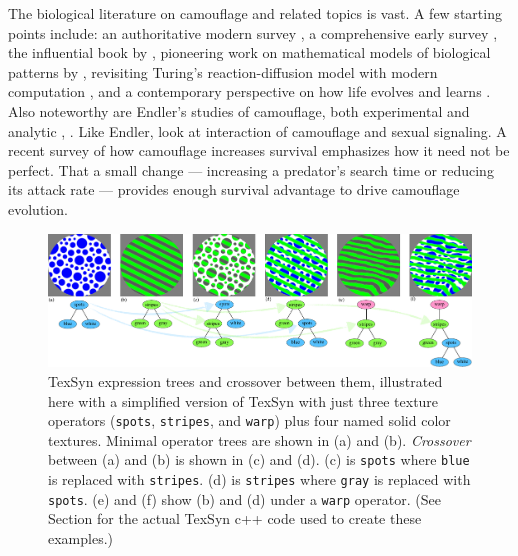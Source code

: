 \documentclass[letterpaper]{article}
\newcommand{\texsyn}[0]{TexSyn}
\newcommand{\stt}[1]{{\small \texttt{#1}}}
\begin{document}
The biological literature on camouflage and related topics is vast. A few starting points include: an authoritative modern survey \citep{cuthill_camouflage_2019}, a comprehensive early survey \citep{thayer_concealing-coloration_1909}, the influential book by \citet{cott_adaptive_1940}, pioneering work on mathematical models of biological patterns by \citet{turing_chemical_1952}, revisiting Turing's reaction-diffusion model with modern computation \citep{murray_how_1988}, and a contemporary perspective on how life evolves and learns \citep{valiant_probably_2013}. Also noteworthy are Endler's studies of camouflage, both experimental \citep{endler_natural_1980} and analytic \citep{endler_predators_1978}, \citep{endler_framework_2012}. Like Endler, \citet{brichard_natural_2023} look at interaction of camouflage and sexual signaling. A recent survey of how camouflage increases survival \citep{de_alcantara_viana_predator_2022} emphasizes how it need not be perfect. That a small change — increasing a predator's search time or reducing its attack rate — provides enough survival advantage to drive camouflage evolution.
\par



\begin{figure}[t]
    \includegraphics[width=\textwidth]{texsyn_overview.pdf}
    \caption{\texsyn{} expression trees and crossover between them, illustrated here with a simplified version of \texsyn{} with just three texture operators (\stt{spots}, \stt{stripes}, and \stt{warp}) plus four named solid color textures. Minimal operator trees are shown in (a) and (b). \textit{Crossover} between (a) and (b) is shown in (c) and (d). (c) is \stt{spots} where \stt{blue} is replaced with \stt{stripes}. (d) is \stt{stripes} where \stt{gray} is replaced with \stt{spots}. (e) and (f) show (b) and (d) under a \texttt{warp} operator. (See Section  for the actual \texsyn{} c++ code used to create these examples.)}
    \label{fig:TexSyn_overview}
\end{figure}
\end{document}
